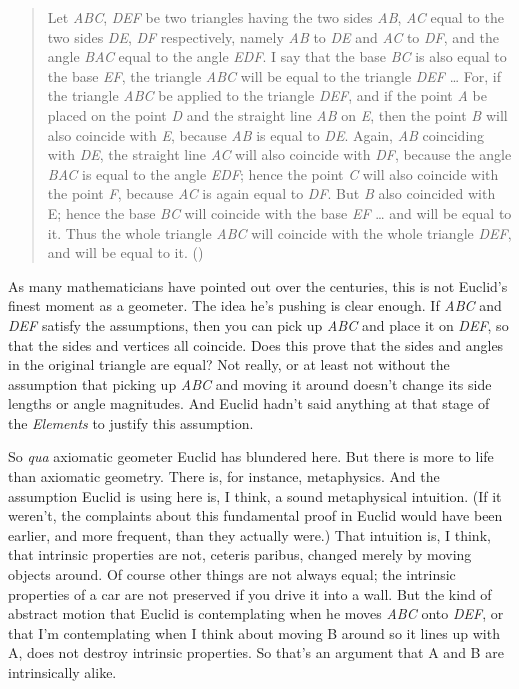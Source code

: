 \documentclass[
  10pt,
  letterpaper,
  DIV=11,
  numbers=noendperiod,
  twoside]{scrartcl}
\begin{document}
\begin{quote}
Let \emph{ABC}, \emph{DEF} be two triangles having the two sides
\emph{AB}, \emph{AC} equal to the two sides \emph{DE}, \emph{DF}
respectively, namely \emph{AB} to \emph{DE} and \emph{AC} to \emph{DF},
and the angle \emph{BAC} equal to the angle \emph{EDF}. I say that the
base \emph{BC} is also equal to the base \emph{EF}, the triangle
\emph{ABC} will be equal to the triangle \emph{DEF} \ldots{} For, if the
triangle \emph{ABC} be applied to the triangle \emph{DEF}, and if the
point \emph{A} be placed on the point \emph{D} and the straight line
\emph{AB} on \emph{E}, then the point \emph{B} will also coincide with
\emph{E}, because \emph{AB} is equal to \emph{DE}. Again, \emph{AB}
coinciding with \emph{DE}, the straight line \emph{AC} will also
coincide with \emph{DF}, because the angle \emph{BAC} is equal to the
angle \emph{EDF}; hence the point \emph{C} will also coincide with the
point \emph{F}, because \emph{AC} is again equal to \emph{DF}. But
\emph{B} also coincided with E; hence the base \emph{BC} will coincide
with the base \emph{EF} \ldots{} and will be equal to it. Thus the whole
triangle \emph{ABC} will coincide with the whole triangle \emph{DEF},
and will be equal to it. ()
\end{quote}

As many mathematicians have pointed out over the centuries, this is not
Euclid's finest moment as a geometer. The idea he's pushing is clear
enough. If \emph{ABC} and \emph{DEF} satisfy the assumptions, then you
can pick up \emph{ABC} and place it on \emph{DEF}, so that the sides and
vertices all coincide. Does this prove that the sides and angles in the
original triangle are equal? Not really, or at least not without the
assumption that picking up \emph{ABC} and moving it around doesn't
change its side lengths or angle magnitudes. And Euclid hadn't said
anything at that stage of the \emph{Elements} to justify this
assumption.

So \emph{qua} axiomatic geometer Euclid has blundered here. But there is
more to life than axiomatic geometry. There is, for instance,
metaphysics. And the assumption Euclid is using here is, I think, a
sound metaphysical intuition. (If it weren't, the complaints about this
fundamental proof in Euclid would have been earlier, and more frequent,
than they actually were.) That intuition is, I think, that intrinsic
properties are not, ceteris paribus, changed merely by moving objects
around. Of course other things are not always equal; the intrinsic
properties of a car are not preserved if you drive it into a wall. But
the kind of abstract motion that Euclid is contemplating when he moves
\emph{ABC} onto \emph{DEF}, or that I'm contemplating when I think about
moving B around so it lines up with A, does not destroy intrinsic
properties. So that's an argument that A and B are intrinsically alike.
\end{document}
